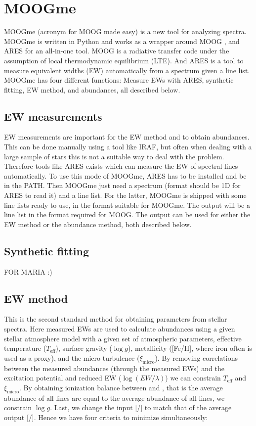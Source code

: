 \documentclass{aa}
\begin{document}
\section{MOOGme}
\label{sec:MOOGme}

MOOGme (acronym for MOOG made easy) is a new tool for analyzing spectra.
MOOGme is written in Python and works as a wrapper around MOOG
\citep{Sneden1973}, and ARES \citep{Sousa2015a} for an all-in-one tool.
MOOG is a radiative transfer code under the assumption of local
thermodynamic equilibrium (LTE). And ARES is a tool to measure equivalent
widths (EW) automatically from a spectrum given a line list. MOOGme has
four different functions: Measure EWs with ARES, synthetic fitting, EW method,
and abundances, all described below.

\subsection{EW measurements}
\label{sub:EW_measurements}
EW measurements are important for the EW method and to obtain abundances. This
can be done manually using a tool like IRAF, but often when dealing with a large
sample of stars this is not a suitable way to deal with the problem. Therefore
tools like ARES exists which can measure the EW of spectral lines automatically.
To use this mode of MOOGme, ARES has to be installed and be in the PATH. Then
MOOGme just need a spectrum (format should be 1D for ARES to read it) and a line
list. For the latter, MOOGme is shipped with some line lists ready to use, in
the format suitable for MOOGme. The output will be a line list in the format
required for MOOG. The output can be used for either the EW method or the
abundance method, both described below.


\subsection{Synthetic fitting}
\label{sub:Synthetic_fitting}

FOR MARIA :)



\subsection{EW method}
\label{sub:EW_method}
This is the second standard method for obtaining parameters from stellar
spectra. Here measured EWs are used to calculate abundances using a given
stellar atmosphere model with a given set of atmospheric parameters,
effective temperature ($T_\mathrm{eff}$), surface gravity ($\log g$),
metallicity ([Fe/H], where iron often is used as a proxy), and the micro
turbulence ($\xi_\mathrm{micro}$). By removing correlations between the measured
abundances (through the measured EWs) and the excitation potential and reduced
EW ($\log(EW/\lambda)$) we can constrain $T_\mathrm{eff}$ and $\xi_\mathrm{micro}$. By
obtaining ionization balance between  and , that is
the average abundance of all  lines are equal to the average
abundance of all  lines, we constrain $\log g$. Last, we change
the input [/] to match that of the average output
[/]. Hence we have four criteria to minimize simultaneously:
\end{document}
